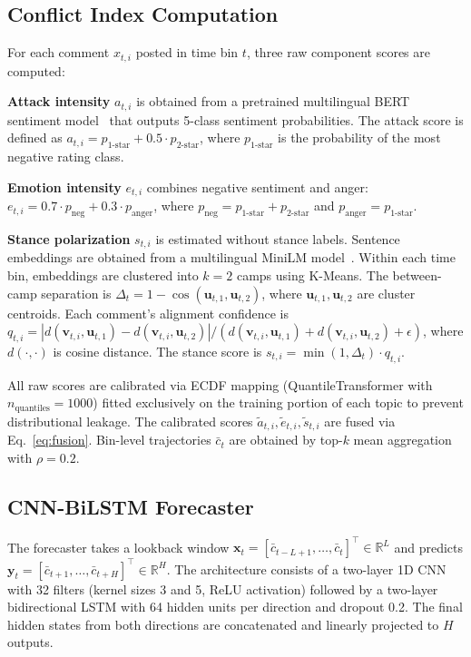 \documentclass[11pt,a4paper]{article}
\begin{document}
\subsection{Conflict Index Computation}

For each comment $x_{t,i}$ posted in time bin $t$, three raw component scores are computed:

\textbf{Attack intensity} $a_{t,i}$ is obtained from a pretrained multilingual BERT sentiment model~\cite{bert-multilingual-sentiment} that outputs 5-class sentiment probabilities. The attack score is defined as $a_{t,i} = p_{\text{1-star}} + 0.5 \cdot p_{\text{2-star}}$, where $p_{\text{1-star}}$ is the probability of the most negative rating class.

\textbf{Emotion intensity} $e_{t,i}$ combines negative sentiment and anger: $e_{t,i} = 0.7 \cdot p_{\text{neg}} + 0.3 \cdot p_{\text{anger}}$, where $p_{\text{neg}} = p_{\text{1-star}} + p_{\text{2-star}}$ and $p_{\text{anger}} = p_{\text{1-star}}$.

\textbf{Stance polarization} $s_{t,i}$ is estimated without stance labels. Sentence embeddings are obtained from a multilingual MiniLM model~\cite{wang2020minilm}. Within each time bin, embeddings are clustered into $k{=}2$ camps using K-Means. The between-camp separation is $\Delta_t = 1 - \cos(\mathbf{u}_{t,1}, \mathbf{u}_{t,2})$, where $\mathbf{u}_{t,1},\mathbf{u}_{t,2}$ are cluster centroids. Each comment's alignment confidence is $q_{t,i} = |d(\mathbf{v}_{t,i},\mathbf{u}_{t,1}) - d(\mathbf{v}_{t,i},\mathbf{u}_{t,2})| / (d(\mathbf{v}_{t,i},\mathbf{u}_{t,1}) + d(\mathbf{v}_{t,i},\mathbf{u}_{t,2}) + \epsilon)$, where $d(\cdot,\cdot)$ is cosine distance. The stance score is $s_{t,i} = \min(1, \Delta_t) \cdot q_{t,i}$.

All raw scores are calibrated via ECDF mapping (QuantileTransformer with $n_{\text{quantiles}}=1000$) fitted exclusively on the training portion of each topic to prevent distributional leakage. The calibrated scores $\tilde{a}_{t,i}, \tilde{e}_{t,i}, \tilde{s}_{t,i}$ are fused via Eq.~\ref{eq:fusion}. Bin-level trajectories $\bar{c}_t$ are obtained by top-$k$ mean aggregation with $\rho=0.2$.

\subsection{CNN-BiLSTM Forecaster}

The forecaster takes a lookback window $\mathbf{x}_t = [\bar{c}_{t-L+1},\dots,\bar{c}_t]^\top \in \mathbb{R}^L$ and predicts $\mathbf{y}_t = [\bar{c}_{t+1},\dots,\bar{c}_{t+H}]^\top \in \mathbb{R}^H$. The architecture consists of a two-layer 1D CNN with 32 filters (kernel sizes 3 and 5, ReLU activation) followed by a two-layer bidirectional LSTM with 64 hidden units per direction and dropout 0.2. The final hidden states from both directions are concatenated and linearly projected to $H$ outputs.
\end{document}
